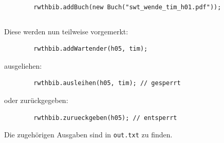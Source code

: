 \documentclass{article}
\begin{document}
    \begin{verbatim}
        rwthbib.addBuch(new Buch("swt_wende_tim_h01.pdf"));
    \end{verbatim}

    \inputminted{java}{Buch.java}

    Diese werden nun teilweise vorgemerkt:
    
    \begin{verbatim}
		rwthbib.addWartender(h05, tim);
    \end{verbatim}

    ausgeliehen:
    
    \begin{verbatim}
		rwthbib.ausleihen(h05, tim); // gesperrt
    \end{verbatim}

    oder zurückgegeben:
    
    \begin{verbatim}
		rwthbib.zurueckgeben(h05); // entsperrt
    \end{verbatim}

    Die zugehörigen Ausgaben sind in \texttt{out.txt} zu finden.

    
\end{document}
